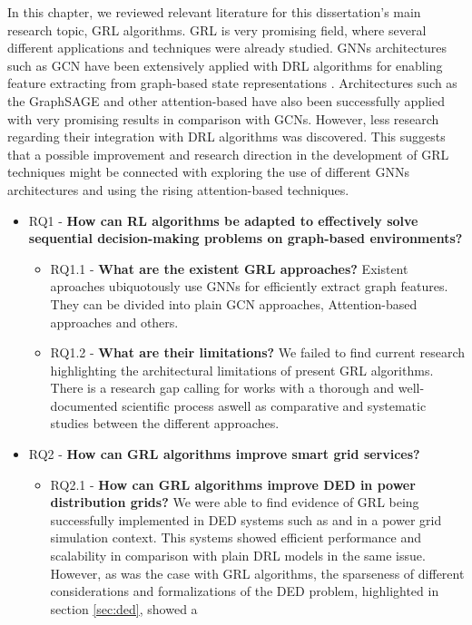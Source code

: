 In this chapter, we reviewed relevant literature for this dissertation's main research topic, \ac{GRL} algorithms. \ac{GRL} is very promising field, where several different applications and techniques were already studied. \acp{GNN} architectures such as \ac{GCN} have been extensively applied with DRL algorithms for enabling feature extracting from graph-based state representations \cite{chenScalableGraphReinforcement2023, chenAutonomousExplorationUncertainty2020}. Architectures such as the GraphSAGE and other attention-based have also been successfully applied with very promising results \cite{peiEmergencyControlStrategy2023, xingRealtimeOptimalScheduling2023} in comparison with \acp{GCN}. However, less research regarding their integration with DRL algorithms was discovered. This suggests that a possible improvement and research direction in the development of \ac{GRL} techniques might be connected with exploring the use of different \acp{GNN} architectures and using the rising attention-based techniques.

\begin{itemize}
	\item RQ1 - \textbf{How can \ac{RL} algorithms be adapted to effectively solve sequential decision-making problems on graph-based environments?} 
	\begin{itemize}
		\item RQ1.1 - \textbf{What are the existent \ac{GRL} approaches?}
		 Existent aproaches ubiquotously use \acp{GNN} for efficiently extract graph features. They can be divided into plain \ac{GCN} approaches, Attention-based approaches and others. \\
		\item RQ1.2 - \textbf{What are their limitations?}
		 We failed to find current research highlighting the architectural limitations of present \ac{GRL} algorithms. There is a research gap calling for works with a thorough and well-documented scientific process aswell as comparative and systematic studies between the different approaches. \\
	\end{itemize}
	\item RQ2 - \textbf{How can \ac{GRL} algorithms improve smart grid services?}
	\begin{itemize}
		\item RQ2.1 - \textbf{How can \ac{GRL} algorithms improve \acf{DED} in power distribution grids?}  We were able to find evidence of \ac{GRL} being successfully implemented in \ac{DED} systems such as \cite{chenScalableGraphReinforcement2023} and \cite{liNovelGraphReinforcement2022} in a power grid simulation context. This systems showed efficient performance and scalability in comparison with plain \ac{DRL} models in the same issue. However, as was the case with \ac{GRL} algorithms, the sparseness of different considerations and formalizations of the \ac{DED} problem, highlighted in section \ref{sec:ded}, showed a 
	\end{itemize}
\end{itemize}





